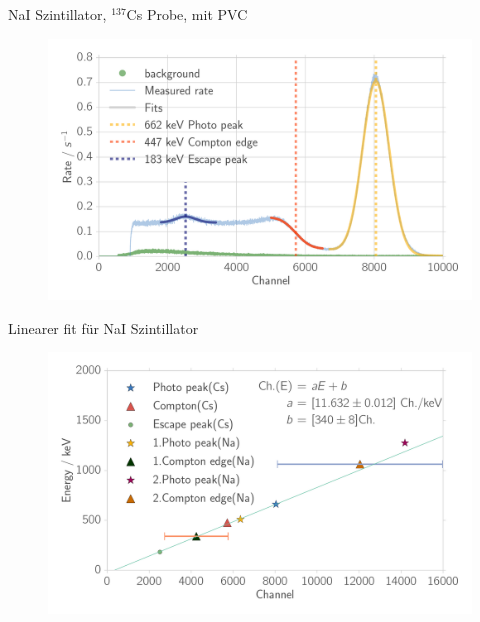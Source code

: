 \documentclass[xcolor=x11names,compress]{beamer}
\renewcommand{\(}{\begin{columns}}
\renewcommand{\)}{\end{columns}}
\newcommand{\<}[1]{\begin{column}{#1}}
\renewcommand{\>}{\end{column}}
\begin{document}
\begin{frame}[t]{NaI Szintillator, $^{137}$Cs Probe, mit PVC}
 \begin{figure}[htpb]
    \centering
    \includegraphics[width=1.0\linewidth]{../analysis/figures/histo_na_137cs}
    \label{fig:histo_na_137cs}
\end{figure}
\end{frame}

\begin{frame}[t]{Linearer fit für NaI Szintillator}
 \begin{figure}[htpb]
    \centering
    \includegraphics[width=1.0\linewidth]{../analysis/figures/calibration_na_linear_fit}
    \label{fig:calibration_na_linear_fit}
\end{figure}
\end{frame}
\end{document}
